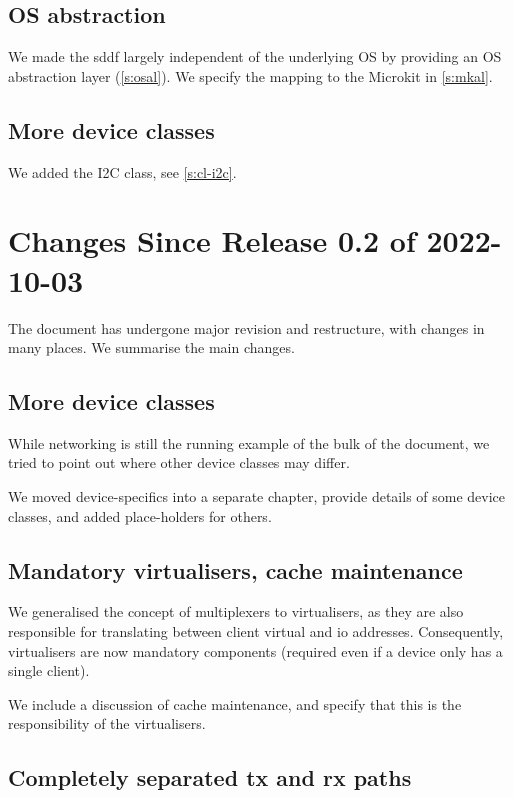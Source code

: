 \documentclass[a4paper,12pt]{report}
\begin{document}
\subsection{OS abstraction}

We made the \gls{sddf} largely independent of the underlying OS by
providing an OS abstraction layer (\autoref{s:osal}). We specify the
mapping to the Microkit in \autoref{s:mkal}.

\subsection{More device classes}

We added the I2C class, see \autoref{s:cl-i2c}.

\section{Changes Since Release 0.2 of 2022-10-03}

The document has undergone major revision and restructure, with
changes in many places. We summarise the main changes.

\subsection{More device classes}

While networking is still the running example of the bulk of the
document, we tried to point out where other device classes may differ.

We moved device-specifics into a separate chapter, provide details
of some device classes, and added place-holders for others.

\subsection{Mandatory virtualisers, cache maintenance}

We generalised the concept of multiplexers to virtualisers, as they
are also responsible for translating between client virtual and \gls{io}
addresses. Consequently, virtualisers are now mandatory components
(required even if a device only has a single client).

We include a discussion of cache maintenance, and specify that this is
the responsibility of the virtualisers.

\subsection{Completely separated \gls{tx} and \gls{rx} paths}
\end{document}
